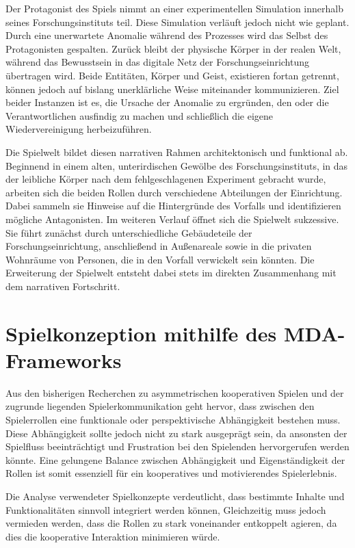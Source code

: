 Der Protagonist des Spiels nimmt an einer experimentellen Simulation innerhalb seines Forschungsinstituts teil. Diese Simulation verläuft jedoch nicht wie geplant. Durch eine unerwartete Anomalie während des Prozesses wird das Selbst des Protagonisten gespalten. Zurück bleibt der physische Körper in der realen Welt, während das Bewusstsein in das digitale Netz der Forschungseinrichtung übertragen wird. Beide Entitäten, Körper und Geist, existieren fortan getrennt, können jedoch auf bislang unerklärliche Weise miteinander kommunizieren. Ziel beider Instanzen ist es, die Ursache der Anomalie zu ergründen, den oder die Verantwortlichen ausfindig zu machen und schließlich die eigene Wiedervereinigung herbeizuführen.

Die Spielwelt bildet diesen narrativen Rahmen architektonisch und funktional ab. Beginnend in einem alten, unterirdischen Gewölbe des Forschungsinstituts, in das der leibliche Körper nach dem fehlgeschlagenen Experiment gebracht wurde, arbeiten sich die beiden Rollen durch verschiedene Abteilungen der Einrichtung. Dabei sammeln sie Hinweise auf die Hintergründe des Vorfalls und identifizieren mögliche Antagonisten. Im weiteren Verlauf öffnet sich die Spielwelt sukzessive. Sie führt zunächst durch unterschiedliche Gebäudeteile der Forschungseinrichtung, anschließend in Außenareale sowie in die privaten Wohnräume von Personen, die in den Vorfall verwickelt sein könnten. Die Erweiterung der Spielwelt entsteht dabei stets im direkten Zusammenhang mit dem narrativen Fortschritt.


\section{Spielkonzeption mithilfe des MDA-Frameworks}

Aus den bisherigen Recherchen zu asymmetrischen kooperativen Spielen und der zugrunde liegenden Spielerkommunikation geht hervor, dass zwischen den Spielerrollen eine funktionale oder perspektivische Abhängigkeit bestehen muss. Diese Abhängigkeit sollte jedoch nicht zu stark ausgeprägt sein, da ansonsten der Spielfluss beeinträchtigt und Frustration bei den Spielenden hervorgerufen werden könnte. Eine gelungene Balance zwischen Abhängigkeit und Eigenständigkeit der Rollen ist somit essenziell für ein kooperatives und motivierendes Spielerlebnis.

Die Analyse verwendeter Spielkonzepte verdeutlicht, dass bestimmte Inhalte und Funktionalitäten sinnvoll integriert werden können, Gleichzeitig muss jedoch vermieden werden, dass die Rollen zu stark voneinander entkoppelt agieren, da dies die kooperative Interaktion minimieren würde.

